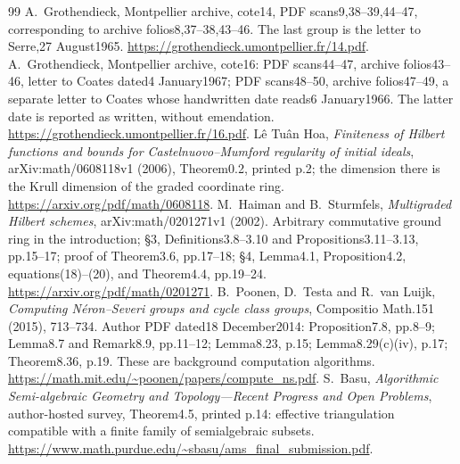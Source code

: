 \begin{thebibliography}{99}
 A.~Grothendieck, Montpellier archive, cote14, PDF scans9,38--39,44--47, corresponding to archive folios8,37--38,43--46. The last group is the letter to Serre,27 August1965. \url{https://grothendieck.umontpellier.fr/14.pdf}.
 A.~Grothendieck, Montpellier archive, cote16: PDF scans44--47, archive folios43--46, letter to Coates dated4 January1967; PDF scans48--50, archive folios47--49, a separate letter to Coates whose handwritten date reads6 January1966. The latter date is reported as written, without emendation. \url{https://grothendieck.umontpellier.fr/16.pdf}.
 L\^e Tu\^an Hoa, \emph{Finiteness of Hilbert functions and bounds for Castelnuovo--Mumford regularity of initial ideals}, arXiv:math/0608118v1 (2006), Theorem0.2, printed p.2; the dimension there is the Krull dimension of the graded coordinate ring. \url{https://arxiv.org/pdf/math/0608118}.
 M.~Haiman and B.~Sturmfels, \emph{Multigraded Hilbert schemes}, arXiv:math/0201271v1 (2002). Arbitrary commutative ground ring in the introduction; \S3, Definitions3.8--3.10 and Propositions3.11--3.13, pp.15--17; proof of Theorem3.6, pp.17--18; \S4, Lemma4.1, Proposition4.2, equations(18)--(20), and Theorem4.4, pp.19--24. \url{https://arxiv.org/pdf/math/0201271}.
 B.~Poonen, D.~Testa and R.~van Luijk, \emph{Computing N\'eron--Severi groups and cycle class groups}, Compositio Math.151 (2015), 713--734. Author PDF dated18 December2014: Proposition7.8, pp.8--9; Lemma8.7 and Remark8.9, pp.11--12; Lemma8.23, p.15; Lemma8.29(c)(iv), p.17; Theorem8.36, p.19. These are background computation algorithms. \url{https://math.mit.edu/~poonen/papers/compute_ns.pdf}.
 S.~Basu, \emph{Algorithmic Semi-algebraic Geometry and Topology---Recent Progress and Open Problems}, author-hosted survey, Theorem4.5, printed p.14: effective triangulation compatible with a finite family of semialgebraic subsets. \url{https://www.math.purdue.edu/~sbasu/ams_final_submission.pdf}.
\end{thebibliography}
